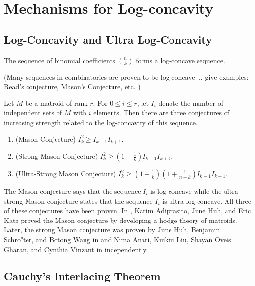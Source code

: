 \documentclass{puthesis-UG}
\begin{document}
\chapter{Mechanisms for Log-concavity}


\section{Log-Concavity and Ultra Log-Concavity}

\begin{defn}

\end{defn}
	
\begin{example}
	The sequence of binomial coefficients $\binom{n}{k}$ forms a log-concave sequence. 
\end{example}
(Many sequences in combinatorics are proven to be log-concave ... give examples: Read's conjecture, Mason's Conjecture, etc. )

\begin{example}
	Let $M$ be a matroid of rank $r$. For $0 \leq i \leq r$, let $I_i$ denote the number of independent sets of $M$ with $i$ elements. Then there are three conjectures of increasing strength related to the log-concavity of this sequence. 
	\begin{enumerate}
		\item (Mason Conjecture) $I_k^2 \geq I_{k-1} I_{k+1}$. 
		\item (Strong Mason Conjecture) $I_k^2 \geq \left (1 + \frac{1}{k} \right ) I_{k-1} I_{k+1}$. 
		\item (Ultra-Strong Mason Conjecture) $I_k^2 \geq \left (1 + \frac{1}{k} \right ) \left (1 + \frac{1}{n-k} \right ) I_{k-1} I_{k+1}$. 
	\end{enumerate}
	The Mason conjecture says that the sequence $I_i$ is log-concave while the ultra-strong Mason conjecture states that the sequence $I_i$ is ultra-log-concave. All three of these conjectures have been proven. In \cite{AHK}, Karim Adiprasito, June Huh, and Eric Katz proved the Mason conjecture by developing a hodge theory of matroids. Later, the strong Mason conjecture was proven by June Huh, Benjamin Schro"ter, and Botong Wang in \cite{correlation-bounds} and Nima Anari, Kuikui Liu, Shayan Oveis Gharan, and Cynthia Vinzant in \cite{anari2018logconcave} independently. 
\end{example}

\section{Cauchy's Interlacing Theorem}
\end{document}

